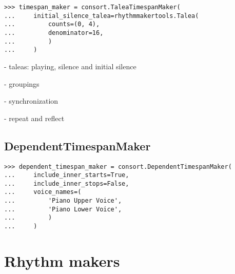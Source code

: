 \begin{comment}
<abjad>
timespan_maker = consort.TaleaTimespanMaker(
    initial_silence_talea=rhythmmakertools.Talea(
        counts=(0, 4),
        denominator=16,
        )
    )
</abjad>
\end{comment}

\begin{singlespacing}
\vspace{-0.5\baselineskip}
\begin{lstlisting}
>>> timespan_maker = consort.TaleaTimespanMaker(
...     initial_silence_talea=rhythmmakertools.Talea(
...         counts=(0, 4),
...         denominator=16,
...         )
...     )
\end{lstlisting}
\end{singlespacing}

- taleas: playing, silence and initial silence

- groupings

- synchronization

- repeat and reflect

\subsection{DependentTimespanMaker} %

\begin{comment}
<abjad>
dependent_timespan_maker = consort.DependentTimespanMaker(
    include_inner_starts=True,
    include_inner_stops=False,
    voice_names=(
        'Piano Upper Voice',
        'Piano Lower Voice',
        )
    )
</abjad>
\end{comment}

\begin{singlespacing}
\vspace{-0.5\baselineskip}
\begin{lstlisting}
>>> dependent_timespan_maker = consort.DependentTimespanMaker(
...     include_inner_starts=True,
...     include_inner_stops=False,
...     voice_names=(
...         'Piano Upper Voice',
...         'Piano Lower Voice',
...         )
...     )
\end{lstlisting}
\end{singlespacing}

\section{Rhythm makers}

